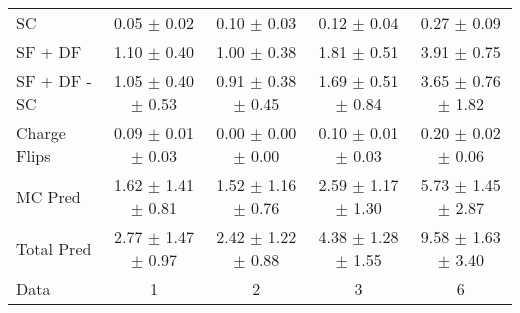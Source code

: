 \begin{tabular}{l|cccc}
                                 SC &  0.05 $\pm$  0.02 &  0.10 $\pm$  0.03 &  0.12 $\pm$  0.04 &  0.27 $\pm$  0.09 \\
                            SF + DF &  1.10 $\pm$  0.40 &  1.00 $\pm$  0.38 &  1.81 $\pm$  0.51 &  3.91 $\pm$  0.75 \\
\hline
                       SF + DF - SC &  1.05 $\pm$  0.40 $\pm$  0.53 &  0.91 $\pm$  0.38 $\pm$  0.45 &  1.69 $\pm$  0.51 $\pm$  0.84 &  3.65 $\pm$  0.76 $\pm$  1.82 \\
\hline\hline
                       Charge Flips &  0.09 $\pm$  0.01 $\pm$  0.03 &  0.00 $\pm$  0.00 $\pm$  0.00 &  0.10 $\pm$  0.01 $\pm$  0.03 &  0.20 $\pm$  0.02 $\pm$  0.06 \\
\hline
                            MC Pred &  1.62 $\pm$  1.41 $\pm$  0.81 &  1.52 $\pm$  1.16 $\pm$  0.76 &  2.59 $\pm$  1.17 $\pm$  1.30 &  5.73 $\pm$  1.45 $\pm$  2.87 \\
\hline
                         Total Pred &  2.77 $\pm$  1.47 $\pm$  0.97 &  2.42 $\pm$  1.22 $\pm$  0.88 &  4.38 $\pm$  1.28 $\pm$  1.55 &  9.58 $\pm$  1.63 $\pm$  3.40 \\
\hline\hline
                               Data &     1 &     2 &     3 &     6 \\
\hline\hline
\end{tabular}

